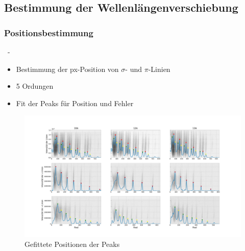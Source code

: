   \subsection{Bestimmung der Wellenlängenverschiebung}
    \subsubsection{Positionsbestimmung}
      \begin{myframe}{\subsecname\ - \subsubsecname}
        \begin{itemize}
            \item Bestimmung der px-Position von $\sigma$- und $\pi$-Linien
            \item 5 Ordungen
            \item Fit der Peaks für Position und Fehler
        \end{itemize}
      \end{myframe}
      \begin{myframe}{}
          \begin{figure}
              \centering
              \includegraphics[width=.85\paperwidth]{img/peaks.png}
              \caption{Gefittete Positionen der Peaks}
          \end{figure}
      \end{myframe}

